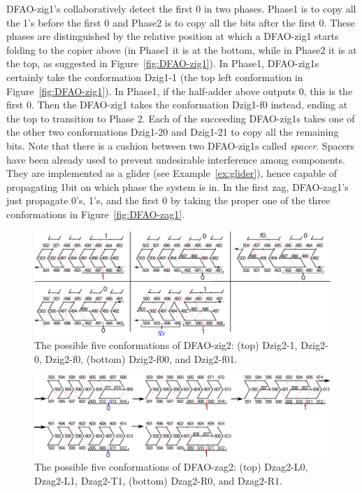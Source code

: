 DFAO-zig1's collaboratively detect the first 0 in two phases.
Phase1 is to copy all the 1's before the first 0 and Phase2 is to copy all the bits after the first 0.
These phases are distinguished by the relative position at which a DFAO-zig1 starts folding to the copier above (in Phase1 it is at the bottom, while in Phase2 it is at the top, as suggested in Figure~\ref{fig:DFAO-zig1}).
In Phase1, DFAO-zig1s certainly take the conformation Dzig1-1 (the top left conformation in Figure~\ref{fig:DFAO-zig1}).
In Phase1, if the half-adder above outputs 0, this is the first 0. 
Then the DFAO-zig1 takes the conformation Dzig1-f0 instead, ending at the top to transition to Phase 2.
Each of the succeeding DFAO-zig1s takes one of the other two conformations Dzig1-20 and Dzig1-21 to copy all the remaining bits. 
Note that there is a cushion between two DFAO-zig1s called \textit{spacer}.
Spacers have been already used to prevent undesirable interference among components.
They are implemented as a glider (see Example~\ref{ex:glider}), hence capable of propagating 1bit on which phase the system is in.
In the first zag, DFAO-zag1's just propagate 0's, 1's, and the first 0 by taking the proper one of the three conformations in Figure~\ref{fig:DFAO-zag1}.

\begin{figure}[h]
\centering
\includegraphics[width=\linewidth]{pic/Dzig2.pdf}
  \caption{The possible five conformations of DFAO-zig2: (top) Dzig2-1, Dzig2-0, Dzig2-f0, (bottom) Dzig2-f00, and Dzig2-f01. }
  \label{fig:DFAO-zig2}
\end{figure} 

\begin{figure}[h]
\centering
\includegraphics[width=\linewidth]{pic/Dzag2.pdf}
  \caption{The possible five conformations of DFAO-zag2: (top) Dzag2-L0, Dzag2-L1, Dzag2-T1, (bottom) Dzag2-R0, and Dzag2-R1.}
  \label{fig:DFAO-zag2}
  \end{figure} 

